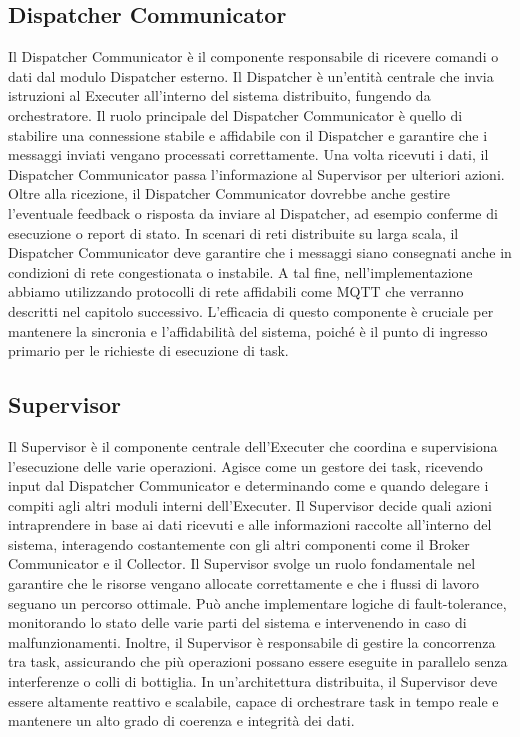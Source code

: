 \documentclass[target=bach,aauheader=,style=]{thud}
\begin{document}
\subsection{Dispatcher Communicator}
Il Dispatcher Communicator è il componente responsabile di ricevere comandi o dati dal modulo Dispatcher esterno. Il Dispatcher è un'entità centrale che invia istruzioni al Executer all'interno del sistema distribuito, fungendo da orchestratore. Il ruolo principale del Dispatcher Communicator è quello di stabilire una connessione stabile e affidabile con il Dispatcher e garantire che i messaggi inviati vengano processati correttamente. Una volta ricevuti i dati, il Dispatcher Communicator passa l'informazione al Supervisor per ulteriori azioni.
Oltre alla ricezione, il Dispatcher Communicator dovrebbe anche gestire l'eventuale feedback o risposta da inviare al Dispatcher, ad esempio conferme di esecuzione o report di stato. In scenari di reti distribuite su larga scala, il Dispatcher Communicator deve garantire che i messaggi siano consegnati anche in condizioni di rete congestionata o instabile. A tal fine, nell'implementazione  abbiamo utilizzando protocolli di rete affidabili come MQTT che verranno descritti nel capitolo successivo. L'efficacia di questo componente è cruciale per mantenere la sincronia e l'affidabilità del sistema, poiché è il punto di ingresso primario per le richieste di esecuzione di task.


\subsection{Supervisor}
Il Supervisor è il componente centrale dell'Executer che coordina e supervisiona l'esecuzione delle varie operazioni. Agisce come un gestore dei task, ricevendo input dal Dispatcher Communicator e determinando come e quando delegare i compiti agli altri moduli interni dell'Executer. Il Supervisor decide quali azioni intraprendere in base ai dati ricevuti e alle informazioni raccolte all'interno del sistema, interagendo costantemente con gli altri componenti come il Broker Communicator e il Collector.
Il Supervisor svolge un ruolo fondamentale nel garantire che le risorse vengano allocate correttamente e che i flussi di lavoro seguano un percorso ottimale. Può anche implementare logiche di fault-tolerance, monitorando lo stato delle varie parti del sistema e intervenendo in caso di malfunzionamenti. Inoltre, il Supervisor è responsabile di gestire la concorrenza tra task, assicurando che più operazioni possano essere eseguite in parallelo senza interferenze o colli di bottiglia. In un'architettura distribuita, il Supervisor deve essere altamente reattivo e scalabile, capace di orchestrare task in tempo reale e mantenere un alto grado di coerenza e integrità dei dati.
\end{document}
